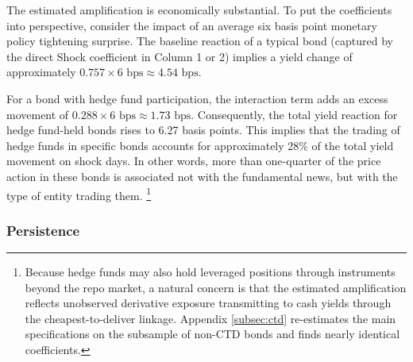 \documentclass[english, 11pt, oneside]{article}
\begin{document}
The estimated amplification is economically substantial. To put the coefficients into perspective, consider the impact of an average six basis point monetary policy tightening surprise. The baseline reaction of a typical bond (captured by the direct Shock coefficient in Column 1 or 2) implies a yield change of approximately $0.757 \times 6 \text{ bps} \approx 4.54 \text{ bps}$.

For a bond with hedge fund participation, the interaction term adds an excess movement of $0.288 \times 6 \text{ bps} \approx 1.73 \text{ bps}$. Consequently, the total yield reaction for hedge fund-held bonds rises to 6.27 basis points. This implies that the trading of hedge funds in specific bonds accounts for approximately 28\% of the total yield movement on shock days. In other words, more than one-quarter of the price action in these bonds is associated not with the fundamental news, but with the type of entity trading them. \footnote{Because hedge funds may also hold leveraged positions through instruments beyond the repo market, a natural concern is that the estimated amplification reflects unobserved derivative exposure transmitting to cash yields through the cheapest-to-deliver linkage. Appendix \ref{subsec:ctd} re-estimates the main specifications on the subsample of non-CTD bonds and finds nearly identical coefficients.}


\subsubsection{Persistence}
\end{document}
